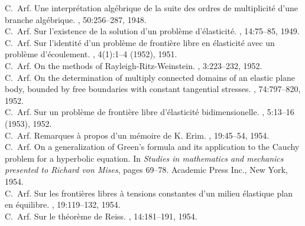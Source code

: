 \documentclass[12pt]{amsart}
\begin{document}
\begin{thebibliography}{10}
C.~Arf.
\newblock Une interpr\'etation alg\'ebrique de la suite des ordres de
  multiplicit\'e d'une branche alg\'ebrique.
, 50:256--287, 1948. \\

C.~Arf.
\newblock Sur l'existence de la solution d'un probl\`eme d'\'elasticit\'e.
, 14:75--85, 1949. \\

C.~Arf.
\newblock Sur l'identit\'e d'un probl\`eme de fronti\`ere libre en
  \'elasticit\'e avec un probl\`eme d'\'ecoulement.
, 4(1):1--4 (1952), 1951. \\

C.~Arf.
\newblock On the methods of {R}ayleigh-{R}itz-{W}einstein.
, 3:223--232, 1952. \\

C.~Arf.
\newblock On the determination of multiply connected domains of an elastic
  plane body, bounded by free boundaries with constant tangential stresses.
, 74:797--820, 1952. \\

C.~Arf.
\newblock Sur un probl\`eme de fronti\`ere libre d'\'elasticit\'e
  bidimensionelle.
, 5:13--16 (1953), 1952. \\

C.~Arf.
\newblock Remarques \`a propos d'un m\'emoire de {K}. {E}rim.
, 19:45--54, 1954. \\

C.~Arf.
\newblock On a generalization of {G}reen's formula and its application to the
  {C}auchy problem for a hyperbolic equation.
\newblock In {\em Studies in mathematics and mechanics presented to Richard von
  Mises}, pages 69--78. Academic Press Inc., New York, 1954. \\

C.~Arf.
\newblock Sur les fronti\`eres libres \`a tensions constantes d'un milieu
  \'elastique plan en \'equilibre.
, 19:119--132, 1954. \\

C.~Arf.
\newblock Sur le th\'eor\`eme de {R}eiss.
, 14:181--191, 1954. \\


\end{thebibliography}
\end{document}
